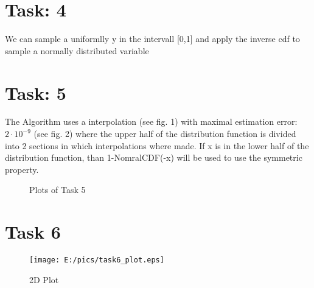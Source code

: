 \documentclass{article}
\begin{document}
\section*{Task: 4} %
We can sample a uniformlly y in the intervall [0,1] and apply the inverse cdf to sample a normally distributed variable

\newpage
\section*{Task: 5} %
The Algorithm uses a interpolation (see fig. 1) with maximal estimation error: $2\cdot 10^{-9}$ (see fig. 2) where the upper half of the distribution function is divided into 2 sections in which interpolations where made. 
If x is in the lower half of the distribution function, than 1-NomralCDF(-x) will be used to use the symmetric property.

\begin{figure} [htbp]
\caption{Plots of Task 5} 
\end{figure} 

\section*{Task 6}
\begin{figure}[htbp]
	\centering
		\texttt{[image: E:/pics/task6\_plot.eps]}
	\caption{2D Plot}
	\label{fig:task6_plot}
\end{figure}
\end{document}
